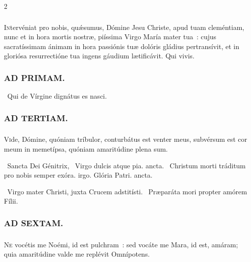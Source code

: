 \documentclass[9pt,twoside]{extarticle}
\begin{document}
\begin{multicols}{2}
\subsubsection*{\center {}}
\lettrine{I}ntervéniat pro nobis, quǽsumus, Dómine Jesu Christe, apud tuam cleméntiam, nunc et in hora mortis nostræ, piíssima Virgo María mater tua~: cujus sacratíssimam ánimam in hora passiónis tuæ dolóris gládius pertransívit, et in gloriósa resurrectióne tua ingens gáudium lætificávit. Qui vivis.

\subsubsection*{\center \textsc{AD PRIMAM.}}
\begin{tightlist}{}
\item {}~Qui de Vírgine dignátus es nasci.
\end{tightlist}

\subsubsection*{\center \textsc{AD TERTIAM.}}
\subsubsection*{}
\lettrine{V}ide, Dómine, quóniam tríbulor, conturbátus est venter meus, subvérsum est cor meum in memetípsa, quóniam amaritúdine plena sum.

\begin{tightlist}{}
\item {}~Sancta Dei Génitrix, \textred{*}~Virgo dulcis atque pia. ancta. ~Christum morti tráditum pro nobis semper exóra. irgo. Glória Patri. ancta.
\item {}~Virgo mater Christi, juxta Crucem adstitísti. ~Præparáta mori propter amórem Fílii.
\end{tightlist}

\subsubsection*{\center \textsc{AD SEXTAM.}}
\subsubsection*{}
\lettrine{N}e vocétis me Noémi, id est pulchram~: sed vocáte me Mara, id est, amáram; quia amaritúdine valde me replévit Omnípotens.


\end{multicols}
\end{document}
